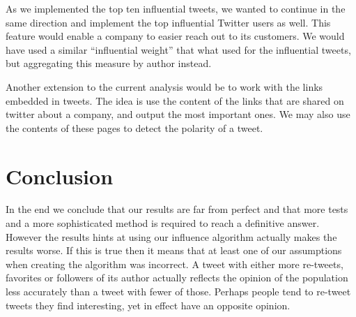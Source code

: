 \documentclass[a4paper,12pt]{report}
\begin{document}
As we implemented the top ten influential tweets, we wanted to continue in the same direction and implement the top influential Twitter users as well. This feature would enable a company to easier reach out to its customers. We would have used a similar “influential weight” that what used for the influential tweets, but aggregating this measure by author instead.

Another extension to the current analysis would be to work with the links embedded in tweets. The idea is use the content of the links that are shared on twitter about a company, and output the most important ones. We may also use the contents of these pages to detect the polarity of a tweet.

\section{Conclusion}

In the end we conclude that our results are far from perfect and that more tests and a more sophisticated method is required to reach a definitive answer. However the results hints at using our influence algorithm actually makes the results worse. If this is true then it means that at least one of our assumptions when creating the algorithm was incorrect. A tweet with either more re-tweets, favorites or followers of its author actually reflects the opinion of the population less accurately than a tweet with fewer of those. Perhaps people tend to re-tweet tweets they find interesting, yet in effect have an opposite opinion.
\end{document}
